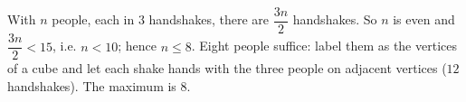 With $n$ people, each in $3$ handshakes, there are $\dfrac{3n}{2}$ handshakes. So $n$ is even and $\dfrac{3n}{2}<15$, i.e. $n<10$; hence $n\le8$. Eight people suffice: label them as the vertices of a cube and let each shake hands with the three people on adjacent vertices ($12$ handshakes). The maximum is $\boxed{8}$.
